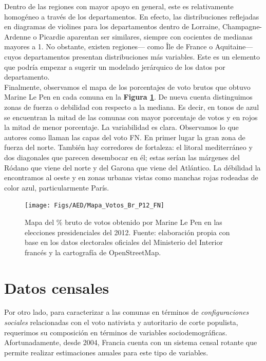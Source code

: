 Dentro de las regiones con mayor apoyo en general, este es relativamente homogéneo a través de los departamentos. En efecto, las distribuciones reflejadas en diagramas de violines para los departamentos dentro de Lorraine, Champagne-Ardenne o Picardie aparentan ser similares, siempre con cocientes de medianas mayores a 1. No obstante, existen regiones--- como Île de France o Aquitaine--- cuyos departamentos presentan distribuciones más variables. Este es un elemento que podría empezar a sugerir un modelado jerárquico de los datos por departamento.\\

Finalmente, observamos el mapa de los porcentajes de voto brutos que obtuvo Marine Le Pen en cada comuna en la \textbf{Figura \ref{fig:Mapa_Pct_Br}}. De nueva cuenta distinguimos zonas de fuerza o debilidad con respecto a la mediana. Es decir, en tonos de azul se encuentran la mitad de las comunas con mayor porcentaje de votos y en rojos la mitad de menor porcentaje. La variabilidad es clara. Observamos lo que autores como \textcite{LeBras15} llaman las capas del voto FN. En primer lugar la gran zona de fuerza del norte. También hay corredores de fortaleza: el litoral mediterráneo y dos diagonales que parecen desembocar en él; estas serían las márgenes del Ródano que viene del norte y del Garona que viene del Atlántico. La débilidad la encontramos al oeste y en zonas urbanas vistas como manchas rojas rodeadas de color azul, particularmente París.

\begin{figure}[h]
	\centering
	\texttt{[image: Figs/AED/Mapa\_Votos\_Br\_P12\_FN]}
	\caption{Mapa del \% bruto de votos obtenido por Marine Le Pen en las elecciones presidenciales del 2012. Fuente: elaboración propia con base en los datos electorales oficiales del Ministerio del Interior francés y la cartografía de OpenStreetMap.}
	\label{fig:Mapa_Pct_Br}	
\end{figure}

\section{Datos censales}

Por otro lado, para caracterizar a las comunas en términos de \textit{configuraciones sociales} relacionadas con el voto nativista y autoritario de corte populista, requerimos su composición en términos de variables sociodemográficas. Afortunadamente, desde 2004, Francia cuenta con un sistema censal rotante que permite realizar estimaciones anuales para este tipo de variables.\\ 

